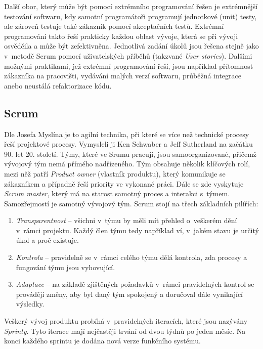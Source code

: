 \documentclass[czech,master]{diploma}
\begin{document}
Další obor, který může být pomocí extrémního programování řešen je extrémnější testování softwaru, kdy samotní programátoři programují jednotkové (unit) testy, ale zároveň testuje také zákazník pomocí akceptačních testů. Extrémní programování takto řeší prakticky každou oblast vývoje, která se při vývoji osvědčila a může být zefektivněna. Jednotlivá zadání úkolů jsou řešena stejně jako v~metodě Scrum pomocí uživatelských příběhů (takzvané \textit{User stories}). Dalšími možnými praktikami, jež extrémní programování řeší, jsou například přítomnost zákazníka na pracovišti, vydávání malých verzí softwaru, průběžná integrace anebo neustálá refaktorizace kódu.

\subsection{Scrum}
Dle Josefa Myslína \cite{ref:scrum_myslin} je to agilní technika, při které se více než technické procesy řeší projektové procesy. Vymysleli ji Ken Schwaber a Jeff Sutherland na začátku 90. let 20. století. Týmy, které ve Srumu pracují, jsou samoorganizované, přičemž vývojový tým nemá přímého nadřízeného. Tým obsahuje několik klíčových rolí, mezi něž patří \textit{Product owner} (vlastník produktu), který komunikuje se zákazníkem a případně řeší priority ve vykonané práci. Dále se zde vyskytuje \textit{Scrum master}, který má na starost samotný proces a interakci s~týmem. Samozřejmostí je samotný vývojový tým. Scrum stojí na třech základních pilířích:

\begin{enumerate}
\item \textit{Transparentnost} -- všichni v~týmu by měli mít přehled o~veškerém dění v~rámci projektu. Každý člen týmu tedy například ví, v~jakém stavu je určitý úkol a proč existuje.
\item \textit{Kontrola} -- pravidelně se v~rámci celého týmu dělá kontrola, zda procesy a fungování týmu jsou vyhovující.
\item \textit{Adaptace} -- na základě zjištěných požadavků v~rámci pravidelných kontrol se provádějí změny, aby byl daný tým spokojený a doručoval dále vynikající výsledky.
\end{enumerate}

Veškerý vývoj produktu probíhá v~pravidelných iteracích, které jsou nazývány \textit{Sprinty}. Tyto iterace mají nejčastěji trvání od dvou týdnů po jeden měsíc. Na konci každého sprintu je dodána nová verze funkčního systému.
\end{document}
